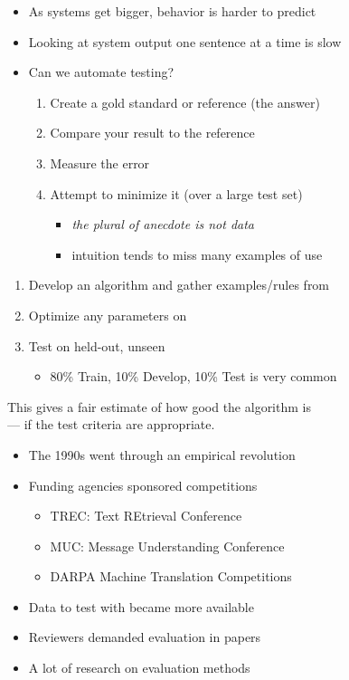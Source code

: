 \documentclass[a4paper,landscape,headrule,footrule,xetex]{foils}
\begin{document}
\MyLogo{}
\begin{itemize}
\item As systems get bigger, behavior is harder to predict
\item Looking at system output one sentence at a time is slow

\item Can we automate testing?
  \begin{enumerate}
  \item Create a gold standard or reference (the  answer)
  \item Compare your result to the reference
  \item Measure the error
  \item Attempt to minimize it  (over a large test set)
    \begin{itemize}
    \item \textit{the plural of anecdote is not data}
    \item intuition tends to miss many examples of use
    \end{itemize}
  \end{enumerate} 

\end{itemize}


\begin{enumerate}
\item Develop an algorithm and gather examples/rules from 
\item Optimize any parameters on 
 
\item Test on held-out, unseen 
   \begin{itemize}
  \item 80\% Train, 10\% Develop, 10\% Test  is very common
  \end{itemize}
\end{enumerate}

This gives a fair estimate of how good the algorithm is 
\\ --- if the test criteria are appropriate.


  \begin{itemize}
  \item The 1990s went through an empirical revolution
  \item Funding agencies sponsored competitions
    \begin{itemize}
    \item TREC: Text REtrieval Conference
    \item MUC: Message Understanding Conference
    \item DARPA Machine Translation Competitions
    \end{itemize}
  \item Data to test with became more available
  \item Reviewers demanded evaluation in papers
  \item A lot of research on evaluation methods
  \end{itemize}
\end{document}
